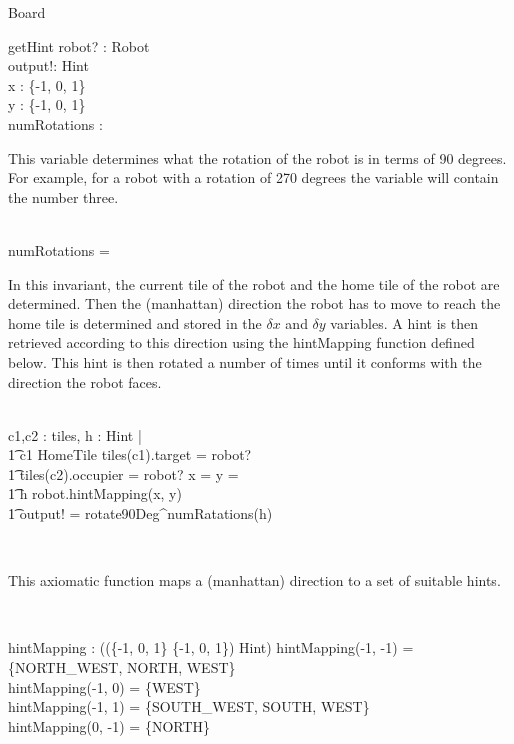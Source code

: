 \begin{class}{Board}
\begin{schema}{getHint}
robot? : Robot \\
output!: Hint \\
\delta x : \{-1, 0, 1\} \\
\delta y : \{-1, 0, 1\} \\
numRotations : \nat
\where
\begin{zpar}
This variable determines what the rotation of the robot is in terms
of 90 degrees. For example, for a robot with a rotation of 270 degrees
the variable will contain the number three.
\end{zpar} \\
numRotations =  \\
\also \also \also
\begin{zpar}
In this invariant, the current tile of the robot and the home tile of the robot
are determined. Then the (manhattan) direction the robot has to move to reach
the home tile is determined and stored in the $\delta x$ and $\delta y$
variables. A hint is then retrieved according to this direction using the
hintMapping function defined below. This hint is then rotated a number of times
until it conforms with the direction the robot faces.
\end{zpar} \\
\exists c1,c2 : \ran tiles, h : Hint | \\ \t1 c1 \in HomeTile \wedge
 tiles(c1).target = robot? \; \; \wedge \\ \t1 tiles(c2).occupier = robot? \wedge
 \delta x =  \wedge \delta y =  \; \; \wedge \\ \t1
 h \in robot.hintMapping(\delta x, \delta y) \; \; \wedge \\ \t1
 output! = rotate90Deg^{numRatations}(h)
\end{schema} \\
\begin{zpar}
This axiomatic function maps a (manhattan) direction to a set of suitable
hints.
\end{zpar} \\
\begin{axdef}
hintMapping : \power ((\{-1, 0, 1\} \cross \{-1, 0, 1\}) \pfun \power Hint)
\where
hintMapping(-1, -1) = \{NORTH\_WEST, NORTH, WEST\} \\
hintMapping(-1, 0) = \{WEST\} \\
hintMapping(-1, 1) = \{SOUTH\_WEST, SOUTH, WEST\} \\
hintMapping(0, -1) = \{NORTH\} \\

\end{axdef}
\end{class}
